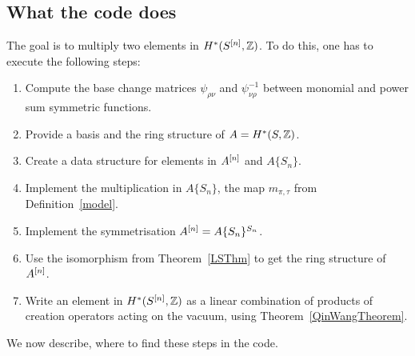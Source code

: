 \subsection{What the code does}
The goal is to multiply two elements in $H^*(S^{[n]},\mathbb{Z})$. To do this, one has to execute the following steps:
\begin{enumerate}
 \item Compute the base change matrices $\psi_{\rho\nu}$ and $\psi_{\nu\rho}^{-1}$ between monomial and power sum symmetric functions.
 \item Provide a basis and the ring structure of $A=H^*(S,\mathbb{Z})$.
 \item Create a data structure for elements in $A^{[n]}$ and $A\{S_n\}$.
 \item Implement the multiplication in $A\{S_n\}$, \ie the map $m_{\pi,\tau}$ from Definition~\ref{model}.
 \item Implement the symmetrisation $A^{[n]} = A\{S_n\}^{S_n}$.
 \item Use the isomorphism from Theorem~\ref{LSThm} to get the ring structure of $A^{[n]}$.
 \item Write an element in $H^*(S^{[n]},\mathbb{Z})$ as a linear combination of products of creation operators acting on the vacuum, using Theorem~\ref{QinWangTheorem}.
\end{enumerate}
We now describe, where to find these steps in the code.
